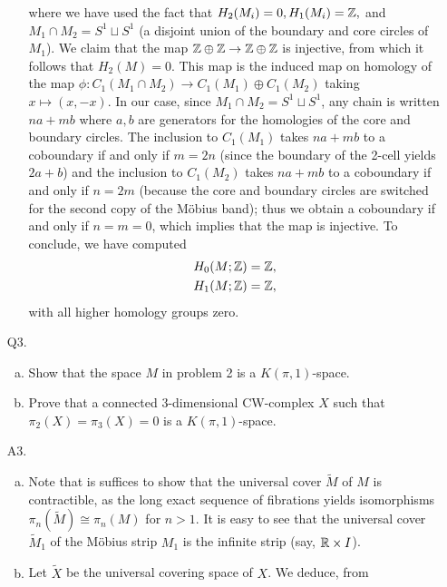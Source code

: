 \documentclass{../mathnotes}
\begin{document}
\begin{enumerate}
\begin{enumerate}[(a)]
                where we have used the fact that $H_2(M_i)=0,H_1(M_i)=\mathbb{Z},$ and $M_1\cap M_2=S^1\sqcup S^1$
                (a disjoint union of the boundary and core circles of $M_1$). We claim that the map
                $\mathbb{Z}\oplus\mathbb{Z}\to\mathbb{Z}\oplus\mathbb{Z}$ is injective, from which it follows that $H_2(M)=0$. This
                map is the induced map on homology of the map $\phi:C_1(M_1\cap M_2)\to C_1(M_1)\oplus C_1(M_2)$
                taking $x\mapsto (x,-x)$. In our case, since $M_1\cap M_2=S^1\sqcup S^1$, any chain is
                written $na+mb$ where $a,b$ are generators for the homologies of the core and boundary circles.
                The inclusion to $C_1(M_1)$ takes $na+mb$ to a coboundary if and only if $m=2n$ (since
                the boundary of the 2-cell yields $2a+b$) and the inclusion to $C_1(M_2)$ takes $na+mb$
                to a coboundary if and only if $n=2m$ (because the core and boundary circles are switched
                for the second copy of the M\"obius band); thus we obtain a coboundary if and only if $n=m=0$,
                which implies that the map is injective. To conclude, we have computed
                \begin{align*}
                    H_0(M;\mathbb{Z}) &= \mathbb{Z},\\
                    H_1(M;\mathbb{Z}) &= \mathbb{Z},
                \end{align*}
                with all higher homology groups zero.
        \end{enumerate}
        \newpage
    \item[Q3.]
        \begin{enumerate}[(a)]
            \item Show that the space $M$ in problem 2 is a $K(\pi, 1)$-space.
            \item Prove that a connected 3-dimensional CW-complex $X$ such that
                $\pi_2(X)=\pi_3(X)=0$ is a $K(\pi,1)$-space.
        \end{enumerate}
    \item[A3.]
        \begin{enumerate}[(a)]
            \item Note that is suffices to show that the universal cover $\tilde M$ of $M$
                is contractible, as the long exact sequence of fibrations yields isomorphisms
                $\pi_n(\tilde M)\cong\pi_n(M)$ for $n>1$. It is easy to see that the universal
                cover $\tilde M_1$ of the M\"obius strip $M_1$ is the infinite strip (say, $\mathbb{R}\times I$).
            \item Let $\tilde X$ be the universal covering space of $X$. We deduce, from

\end{enumerate}
\end{enumerate}
\end{document}
